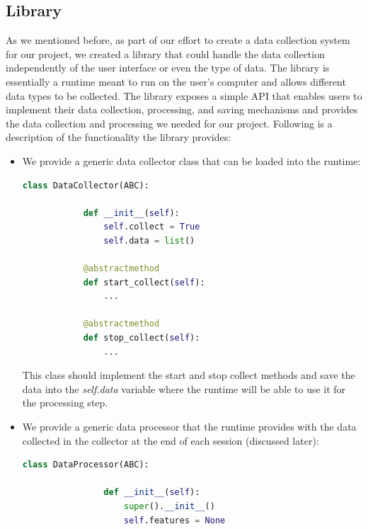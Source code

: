 \documentclass[../main.tex]{subfiles}
\begin{document}
\subsection{Library}
As we mentioned before, as part of our effort to create a data collection system for our project,
we created a library that could handle the data collection independently of the user interface or even the type of data. 
The library is essentially a runtime meant to run on the user's computer and allows different data types to be collected. 
The library exposes a simple API that enables users to implement their data collection, 
processing, and saving mechanisms and provides the data collection and processing we needed for our project. Following is a description of 
the functionality the library provides: 

 \begin{itemize}
    \item We provide a generic data collector class that can be loaded into the runtime:
        \begin{lstlisting}[language=Python]
        class DataCollector(ABC):

            def __init__(self):
                self.collect = True
                self.data = list()

            @abstractmethod
            def start_collect(self):
                ...

            @abstractmethod
            def stop_collect(self):
                ...
        \end{lstlisting}
        This class should implement the start and stop collect methods and save the data into the \textit{self.data}
        variable where the runtime will be able to use it for the processing step.
    \item We provide a generic data processor that the runtime provides with the data collected in the collector at the end of each session (discussed later):
        \begin{lstlisting}[language=Python]
            class DataProcessor(ABC):

                def __init__(self):
                    super().__init__()
                    self.features = None


\end{lstlisting}
\end{itemize}
\end{document}

